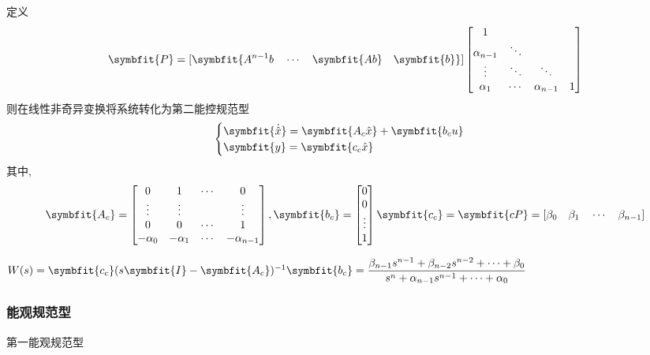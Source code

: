\documentclass[11pt,a4paper]{ctexart}
\newcommand{\bm}{\symbfit}
\begin{document}
            定义
            \[
            \bm{P}=[\bm{A^{n-1}b\quad\cdots\quad\bm{Ab}\quad\bm{b}}]\begin{bmatrix}
                1 &  \\
                \alpha_{n-1}  & \ddots \\
                \vdots  & \ddots & \ddots \\
                \alpha_1  & \cdots & \alpha_{n-1} & 1\\
                \end{bmatrix}
            \]
            则在线性非奇异变换将系统转化为第二能控规范型
            \[
            \begin{cases}
            \bm{\dot{\hat x}}=\bm{A_c\hat x}+\bm{b_c u}\\
            \bm{y}=\bm{c_c\hat x}
            \end{cases}
            \]
            其中,
            \[
            \bm{A_c}=\begin{bmatrix}
                0 & 1 & \cdots & 0 \\
                \vdots & \vdots &  & \vdots \\
                0 & 0 & \cdots & 1 \\
                -\alpha_0 & -\alpha_1 & \cdots & -\alpha_{n-1} \\
            \end{bmatrix},
            \bm{b_c}=\begin{bmatrix}
                0\\0\\ \vdots \\ 1 \\
            \end{bmatrix}
            \bm{c_c}=\bm{cP}=[\beta_0\quad\beta_1\quad\cdots\quad\beta_{n-1}]
            \]

            $W(s)=\bm{c_c}(s\bm{I}-\bm{A_c})^{-1}\bm{b_c}=\dfrac{\beta_{n-1}s^{n-1}+\beta_{n-2}s^{n-2}+\cdots+\beta_0}{s^n+\alpha_{n-1}s^{n-1}+\cdots+\alpha_0}$
            
        \subsubsection{能观规范型}
            第一能观规范型
\end{document}
